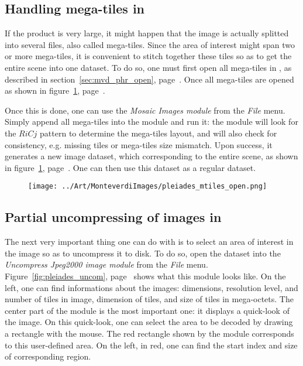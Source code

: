 \subsection{Handling mega-tiles in \mont}

If the \phr product is very large, it might happen that the image is
actually splitted into several \jpg files, also called
mega-tiles. Since the area of interest might span two or more
mega-tiles, it is convenient to stitch together these tiles so as to
get the entire scene into one \mont dataset. To do so, one must first
open all mega-tiles in \mont, as described in
section~\ref{sec:mvd_phr_open}, page~\pageref{sec:mvd_phr_open}. Once
all mega-tiles are opened as shown in
figure~\ref{fig:pleiades_mtiles_open},
page~\pageref{fig:pleiades_mtiles_open}.

Once this is done, one can use the \textit{Mosaic Images module} from
the \textit{File} menu. Simply append all mega-tiles into the module
and run it: the module will look for the $RiCj$ pattern to determine
the mega-tiles layout, and will also check for consistency,
e.g. missing tiles or mega-tiles size mismatch. Upon success, it
generates a new \phr image dataset, which corresponding to the entire
scene, as shown in figure~\ref{fig:pleiades_mtiles_open},
page~\pageref{fig:pleiades_mtiles_open}. One can then use this dataset
as a regular \phr dataset.

\begin{figure}[!t]
  \center
  \texttt{[image: ../Art/MonteverdiImages/pleiades\_mtiles\_open.png]}
  \label{fig:pleiades_mtiles_open}
\end{figure}

\subsection{Partial uncompressing of \phr images in \mont}

The next very important thing one can do with \mont is to select an
area of interest in the \phr image so as to uncompress it to disk. To
do so, open the \phr dataset into the \textit{Uncompress Jpeg2000
image module} from the \textit{File}
menu. Figure~\ref{fig:pleiades_uncom},
page~\pageref{fig:pleiades_uncom} shows what this module looks
like. On the left, one can find informations about the images:
dimensions, resolution level, and number of \jpg tiles in image,
dimension of tiles, and size of tiles in mega-octets. The center part
of the module is the most important one: it displays a quick-look of
the \phr image. On this quick-look, one can select the area to be
decoded by drawing a rectangle with the mouse. The red rectangle shown
by the module corresponds to this user-defined area. On the left, in
red, one can find the start index and size of corresponding region.

